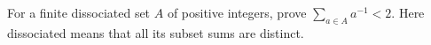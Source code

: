 For a finite dissociated set $A$ of positive integers, prove $\sum_{a\in A}a^{-1}<2$. Here dissociated means that all its subset sums are distinct.
